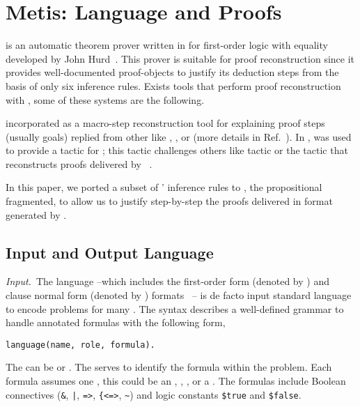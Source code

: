 \documentclass[../main.tex]{subfiles}
\begin{document}

\section{Metis: Language and Proofs}
\label{sec:metis-language-and-proofs}

\Metis is an automatic theorem prover written in  for
first-order logic with equality developed by John Hurd~\cite{hurd2003first}.
This prover is suitable for proof reconstruction since it provides
well-documented proof-objects to justify its deduction steps from the basis
of only six inference rules. Exists tools that perform proof
reconstruction with \Metis, some of these systems are the following.

 incorporated \Metis as a macro-step reconstruction
tool for explaining proof steps (usually \CNF goals) replied from other \ATPs like
, , or 
(more details in Ref.~\cite{paulson2007source}).
In \cite{Farber2015}, \Metis was used to provide a tactic for
; this tactic challenges others like  tactic or the
 tactic that reconstructs proofs delivered by
~\cite{Farber2016}.

In this paper, we ported a subset of \Metis' inference rules to \Agda,
the propositional fragmented, to allow us to justify step-by-step the proofs
delivered in \TSTP format generated by \Metis.


\subsection{Input and Output Language}
\label{ssec:input-and-output-language}

\textit{Input.}~The \TPTP language --which includes the first-order
form (denoted by ) and clause normal form (denoted by )
formats~\cite{sutcliffe2009} -- is de
facto input standard language to encode problems for many \ATPs.
The \TPTP syntax describes a well-defined grammar to handle annotated
formulas with the following form,

\begin{verbatim}
language(name, role, formula).
\end{verbatim}

The  can be  or . The 
serves to identify the formula within the problem. Each formula assumes one
, this could be an , ,
, or a . The formulas include Boolean
connectives (\verb!&!, \verb!|!, \verb!=>!, \verb!{<=>!, \verb!~!) and logic
constants \verb!$true! and \verb!$false!.
\end{document}

